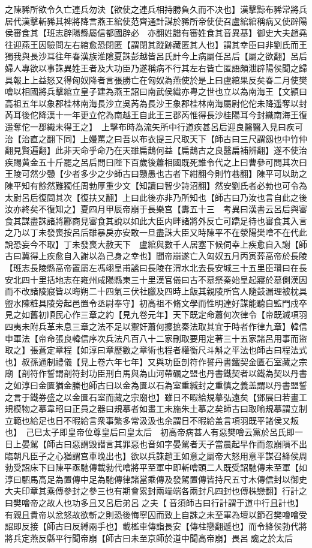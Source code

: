 之陳豨所欲令久亡連兵勿決【欲使之連兵相持勝負久而不决也】漢擊黥布豨常將兵居代漢擊斬豨其裨將降言燕王綰使范齊通計謀於豨所帝使使召盧綰綰稱病又使辟陽侯審食其【班志辟陽縣屬信都國辟必　亦翻姓譜有審姓食其音異基】御史大夫趙堯往迎燕王因驗問左右綰愈恐閉匿【謂閉其蹤跡藏匿其人也】謂其幸臣曰非劉氏而王獨我與長沙耳往年春漢族淮隂夏誅彭越皆呂氏計今上病屬任呂后【屬之欲翻】呂后婦人專欲以事誅異姓王者及大功臣乃遂稱病不行其左右皆亡匿語頗泄辟陽侯聞之歸具報上上益怒又得匈奴降者言張勝亡在匈奴為燕使於是上曰盧綰果反矣春二月使樊噲以相國將兵擊綰立皇子建為燕王詔曰南武侯織亦粤之世也立以為南海王【文頴曰高祖五年以象郡桂林南海長沙立吳芮為長沙王象郡桂林南海屬尉佗佗未降遥奪以封芮耳後佗降漢十一年更立佗為南越王自此王三郡芮惟得長沙桂陽耳今封織南海王復遥奪佗一郡織未得王之】　上擊布時為流矢所中行道疾甚呂后迎良醫醫入見曰疾可治【治直之翻下同】上嫚罵之曰吾以布衣提三尺取天下【師古曰三尺謂劔也中竹仲翻見賢遍翻】此非天命乎命乃在天雖扁鵲何益【扁鵲古之良醫扁補辨翻】遂不使治疾賜黄金五十斤罷之呂后問曰陛下百歲後蕭相國既死誰令代之上曰曹參可問其次曰王陵可然少戇【少者多少之少師古曰戇愚也古者下紺翻今則竹巷翻】陳平可以助之陳平知有餘然難獨任周勃厚重少文【知讀曰智少詩沼翻】然安劉氏者必勃也可令為太尉呂后復問其次【復扶又翻】上曰此後亦非乃所知也【師古曰乃汝也言自此之後汝亦終矣不復知之】夏四月甲辰帝崩于長樂宫【夀五十三　考異曰漢書云呂后與審食其謀盡誅諸將酈商見審食其說以如此大臣内畔諸將外反亡可蹻足待也審食其入言之乃以丁未發喪按呂后雖暴戾亦安敢一旦盡誅大臣又時陳平不在滎陽樊噲不在代此說恐妄今不取】丁未發喪大赦天下　盧綰與數千人居塞下候伺幸上疾愈自入謝【師古曰冀得上疾愈自入謝以為己身之幸也】聞帝崩遂亡入匈奴五月丙寅葬高帝於長陵【班志長陵縣高帝置屬左馮翊皇甫謐曰長陵在渭水北去長安城三十五里臣瓚曰在長安北四十里括地志在雍州咸陽縣東三十里漢官儀曰古不墓祭秦始皇起寢於墓側漢因而不改諸陵寢皆以晦朔二十四氣三伏社臘及四時上飯其親陵所宫人隨鼓漏理被枕具盥水陳粧具陵旁起邑置令丞尉奉守】初高祖不脩文學而性明達好謀能聽自監門戍卒見之如舊初順民心作三章之約【見九卷元年】天下既定命蕭何次律令【帝既滅項羽四夷未附兵革未息三章之法不足以禦奸蕭何攗摭秦法取其宜于時者作律九章】韓信申軍法【帝命張良韓信序次兵法凡百八十二家刪取要用定著三十五家諸呂用事而盜取之】張蒼定章程【如淳曰章歷數之章術也程者權衡尺斗斛之平法也師古曰程法式也】叔孫通制禮儀【見上卷六年七年】又與功臣剖符作誓丹書鐵契金匱石室藏之宗廟【剖符作誓謂剖符封功臣刑白馬與為山河帶礪之盟也丹書鐵契者以鐵為契以丹書之如淳曰金匱猶金縢也師古曰以金為匱以石為室重緘封之重慎之義盖謂以丹書盟誓之言于鐵券盛之以金匱石室而藏之宗廟也】雖日不暇給規摹弘遠矣【鄧展曰若畫工規模物之摹韋昭曰正員之器曰規摹者如畫工未施朱土摹之矣師古曰取喻規摹謂立制立範也給足也日不暇給言衆事繁多常汲汲也余謂日不暇給盖言項羽既平諸侯又叛也】　己巳太子即皇帝位尊皇后曰皇太后　初高帝病甚人有惡樊噲云黨於呂氏即一日上晏駕【師古曰惡謂毁譛言其罪惡也音如字晏駕者天子當晨起早作而忽崩隕不出臨朝凡臣子之心猶謂宫車晚出也】欲以兵誅趙王如意之屬帝大怒用意平謀召絳侯周勃受詔床下曰陳平亟馳傳載勃代噲將平至軍中即斬噲頭二人既受詔馳傳未至軍【如淳曰駟馬高足為置傳中足為馳傳律諸當乘傳及發駕置傳皆持尺五寸木傳信封以御史大夫印章其乘傳參封之參三也有期會累封兩端端各兩封凡四封也傳株戀翻】行計之曰樊噲帝之故人也功多且又呂后弟呂之夫【音須師古曰行計謂于道中行且計也】有親且貴帝以忿怒故欲斬之則恐後悔寧囚而致上自誅之未至軍為壇以節召樊噲噲受詔即反接【師古曰反縛兩手也】載檻車傳詣長安【傳柱戀翻遞也】而令絳侯勃代將將兵定燕反縣平行聞帝崩【師古曰未至京師於道中聞高帝崩】畏呂讒之於太后